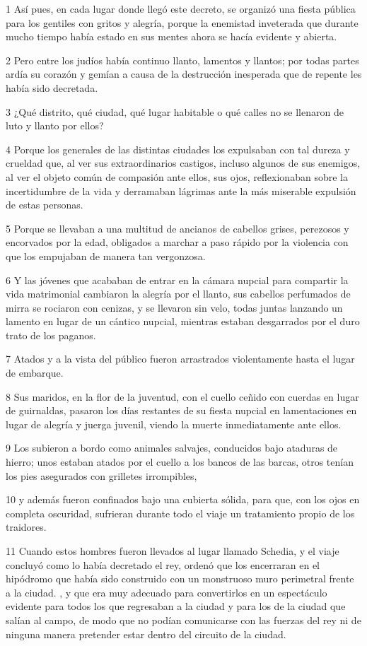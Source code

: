\par 1 Así pues, en cada lugar donde llegó este decreto, se organizó una fiesta pública para los gentiles con gritos y alegría, porque la enemistad inveterada que durante mucho tiempo había estado en sus mentes ahora se hacía evidente y abierta.
\par 2 Pero entre los judíos había continuo llanto, lamentos y llantos; por todas partes ardía su corazón y gemían a causa de la destrucción inesperada que de repente les había sido decretada.
\par 3 ¿Qué distrito, qué ciudad, qué lugar habitable o qué calles no se llenaron de luto y llanto por ellos?
\par 4 Porque los generales de las distintas ciudades los expulsaban con tal dureza y crueldad que, al ver sus extraordinarios castigos, incluso algunos de sus enemigos, al ver el objeto común de compasión ante ellos, sus ojos, reflexionaban sobre la incertidumbre de la vida y derramaban lágrimas ante la más miserable expulsión de estas personas.
\par 5 Porque se llevaban a una multitud de ancianos de cabellos grises, perezosos y encorvados por la edad, obligados a marchar a paso rápido por la violencia con que los empujaban de manera tan vergonzosa.
\par 6 Y las jóvenes que acababan de entrar en la cámara nupcial para compartir la vida matrimonial cambiaron la alegría por el llanto, sus cabellos perfumados de mirra se rociaron con cenizas, y se llevaron sin velo, todas juntas lanzando un lamento en lugar de un cántico nupcial, mientras estaban desgarrados por el duro trato de los paganos.
\par 7 Atados y a la vista del público fueron arrastrados violentamente hasta el lugar de embarque.
\par 8 Sus maridos, en la flor de la juventud, con el cuello ceñido con cuerdas en lugar de guirnaldas, pasaron los días restantes de su fiesta nupcial en lamentaciones en lugar de alegría y juerga juvenil, viendo la muerte inmediatamente ante ellos.
\par 9 Los subieron a bordo como animales salvajes, conducidos bajo ataduras de hierro; unos estaban atados por el cuello a los bancos de las barcas, otros tenían los pies asegurados con grilletes irrompibles,
\par 10 y además fueron confinados bajo una cubierta sólida, para que, con los ojos en completa oscuridad, sufrieran durante todo el viaje un tratamiento propio de los traidores.
\par 11 Cuando estos hombres fueron llevados al lugar llamado Schedia, y el viaje concluyó como lo había decretado el rey, ordenó que los encerraran en el hipódromo que había sido construido con un monstruoso muro perimetral frente a la ciudad. , y que era muy adecuado para convertirlos en un espectáculo evidente para todos los que regresaban a la ciudad y para los de la ciudad que salían al campo, de modo que no podían comunicarse con las fuerzas del rey ni de ninguna manera pretender estar dentro del circuito de la ciudad.
